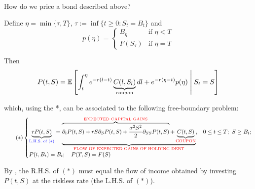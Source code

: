 How do we price a bond described above?

Define $\eta = \min \{\tau, T\}$, $\tau := \inf \{t \geq 0 : S_t = B_t\}$ and
\begin{equation*}
    p(\eta) = \begin{cases} B_\eta & \text{if } \eta < T \\ F(S_\tau) & \text{if } \eta = T \end{cases}
\end{equation*}

Then
\begin{equation*}
    P(t, S) = \mathbb E \left[ \int_t^\eta e^{-r(l-t)} \underbrace{C(l, S_l)}_{\text{coupon}} dl + e^{-r(\eta-t)} p(\eta) \;\middle|\; S_t = S \right]
\end{equation*}

which, using the *, can be associated to the following free-boundary problem:
\begin{equation} \tag{$*$}
\begin{cases}
    \underbrace{rP(t,S)}_{\text{\color{blue}L.H.S. of $(*)$}} = \underbrace{\overbrace{\partial_t P(t,S) + rS\partial_S P(t,S) + \frac{\sigma^2 S^2}{2} \partial_{SS} P(t,S)}^{\text{\color{red}EXPECTED CAPITAL GAINS}} + \underbrace{C(t,S)}_{\text{\color{red}COUPON}}}_{\text{\color{red}FLOW OF EXPECTED GAINS OF HOLDING DEBT}}, & 0 \leq t \leq T; \ S \geq B_t; \\
    P(t, B_t) = B_t; \quad P(T, S) = F(S)
\end{cases}
\end{equation}

By , the R.H.S. of $(*)$ must equal the flow of income obtained by investing $P(t,S)$ at the riskless rate (the L.H.S. of $(*)$).

